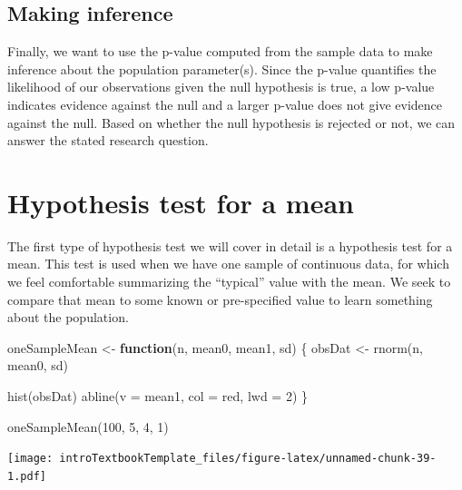 \documentclass[
]{book}
\newenvironment{Shaded}{\begin{snugshade}}{\end{snugshade}}
\newcommand{\AttributeTok}[1]{\textcolor[rgb]{0.77,0.63,0.00}{#1}}
\newcommand{\ControlFlowTok}[1]{\textcolor[rgb]{0.13,0.29,0.53}{\textbf{#1}}}
\newcommand{\DecValTok}[1]{\textcolor[rgb]{0.00,0.00,0.81}{#1}}
\newcommand{\FunctionTok}[1]{\textcolor[rgb]{0.00,0.00,0.00}{#1}}
\newcommand{\NormalTok}[1]{#1}
\newcommand{\OtherTok}[1]{\textcolor[rgb]{0.56,0.35,0.01}{#1}}
\newcommand{\StringTok}[1]{\textcolor[rgb]{0.31,0.60,0.02}{#1}}
\theoremstyle{definition}
\theoremstyle{definition}
\theoremstyle{definition}
\theoremstyle{remark}
\begin{document}
\hypertarget{making-inference}{%
\subsection{Making inference}\label{making-inference}}

Finally, we want to use the p-value computed from the sample data to make inference about the population parameter(s). Since the p-value quantifies the likelihood of our observations given the null hypothesis is true, a low p-value indicates evidence against the null and a larger p-value does not give evidence against the null. Based on whether the null hypothesis is rejected or not, we can answer the stated research question.

\hypertarget{ch8_s2}{%
\section{Hypothesis test for a mean}\label{ch8_s2}}

The first type of hypothesis test we will cover in detail is a hypothesis test for a mean. This test is used when we have one sample of continuous data, for which we feel comfortable summarizing the ``typical'' value with the mean. We seek to compare that mean to some known or pre-specified value to learn something about the population.

\begin{Shaded}
\begin{Highlighting}[]
\NormalTok{oneSampleMean }\OtherTok{\textless{}{-}} \ControlFlowTok{function}\NormalTok{(n, mean0, mean1, sd) \{}
\NormalTok{  obsDat }\OtherTok{\textless{}{-}} \FunctionTok{rnorm}\NormalTok{(n, mean0, sd)}
  
  \FunctionTok{hist}\NormalTok{(obsDat)}
  \FunctionTok{abline}\NormalTok{(}\AttributeTok{v =}\NormalTok{ mean1, }\AttributeTok{col =} \StringTok{\textquotesingle{}red\textquotesingle{}}\NormalTok{, }\AttributeTok{lwd =} \DecValTok{2}\NormalTok{)}
\NormalTok{\}}

\FunctionTok{oneSampleMean}\NormalTok{(}\DecValTok{100}\NormalTok{, }\DecValTok{5}\NormalTok{, }\DecValTok{4}\NormalTok{, }\DecValTok{1}\NormalTok{)}
\end{Highlighting}
\end{Shaded}

\texttt{[image: introTextbookTemplate\_files/figure-latex/unnamed-chunk-39-1.pdf]}
\end{document}
